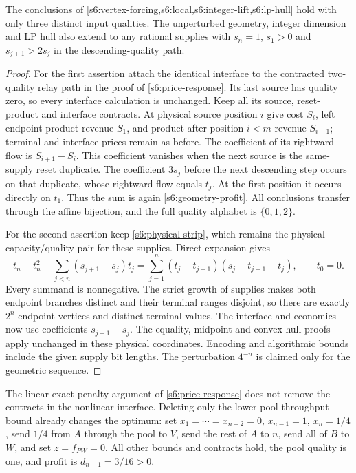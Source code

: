 \begin{corollary}\label{s6:alphabet-geometry}
The conclusions of \cref{s6:vertex-forcing,s6:local,s6:integer-lift,s6:lp-hull}
hold with only three distinct input qualities. The unperturbed geometry,
integer dimension and LP hull also extend to any rational supplies with
$s_n=1$, $s_1>0$ and $s_{j+1}>2s_j$ in the descending-quality path.
\end{corollary}
\begin{proof}
For the first assertion attach the identical interface to the contracted
two-quality relay path in the proof of \cref{s6:price-response}. Its
last source has quality zero, so every interface calculation is unchanged.
Keep all its source, reset-product and interface contracts. At physical
source position $i$ give cost $S_i$, left endpoint product revenue $S_1$,
and product after position $i<m$ revenue $S_{i+1}$; terminal and interface
prices remain as before. The coefficient of its rightward flow is
$S_{i+1}-S_i$. This coefficient vanishes when the next source is the
same-supply reset duplicate. The coefficient $3s_j$ before the next
descending step occurs on that duplicate, whose rightward flow equals
$t_j$. At the first position it occurs directly on $t_1$. Thus the
sum is again \eqref{s6:geometry-profit}. All conclusions transfer through
the affine bijection, and the full quality alphabet is $\{0,1,2\}$.

For the second assertion keep \eqref{s6:physical-strip}, which remains
the physical capacity/quality pair for these supplies. Direct expansion gives
\[
 t_n-t_n^2-\sum_{j<n}(s_{j+1}-s_j)t_j
 =\sum_{j=1}^n(t_j-t_{j-1})(s_j-t_{j-1}-t_j),\qquad t_0=0.
\]
Every summand is nonnegative. The strict growth of supplies makes both
endpoint branches distinct and their terminal ranges disjoint, so there
are exactly $2^n$ endpoint vertices and distinct terminal values.
The interface and economics now use coefficients $s_{j+1}-s_j$.
The equality, midpoint and convex-hull proofs apply unchanged in these
physical coordinates. Encoding and algorithmic bounds include the given
supply bit lengths. The perturbation $4^{-n}$ is claimed only
for the geometric sequence.
\end{proof}

The linear exact-penalty argument of \cref{s6:price-response} does not
remove the contracts in the nonlinear interface. Deleting only
the lower pool-throughput bound already changes the optimum: set
$x_1=\cdots=x_{n-2}=0$, $x_{n-1}=1$, $x_n=1/4$, send $1/4$ from
$A$ through the pool to $V$, send the rest of $A$ to $n$, send all of
$B$ to $W$, and set $z=f_{PW}=0$. All other bounds and contracts hold,
the pool quality is one, and profit is $d_{n-1}=3/16>0$.

